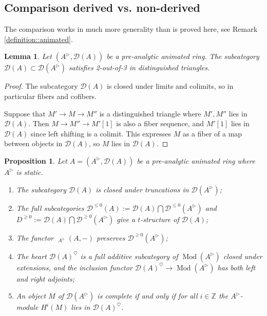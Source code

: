 \documentclass{article}
\theoremstyle{plain}
\newtheorem{prop}[thm]{Proposition}
\newtheorem{lem}[thm]{Lemma}
\theoremstyle{definition}
\theoremstyle{remark}
\DeclareMathOperator{\Homs}{\underline{Hom}}
\DeclareMathOperator{\modcat}{Mod}
\newcommand{\huflag}{\triangleright}
\newcommand{\D}{\mathcal{D}}
\newcommand{\heart}{\heartsuit}
\begin{document}
\subsection{Comparison derived vs. non-derived}
The comparison works in much more generality than is proved here, see Remark \ref{definition::animated}.

\begin{lem}
Let $ (A ^{\huflag}, \D (A)) $ be a pre-analytic animated ring.
The subcategory $ \D (A)\subset \D (A ^{\huflag}) $ satisfies 2-out-of-3 in distinguished triangles.
\end{lem}

\begin{proof}
The subcategory $ \D (A) $ is closed under limits and colimits, so in particular fibers and cofibers.

Suppose that $ M'\to M\to M'' $ is a distinguished triangle where $ M',M'' $ lies in $ \D (A) $.
Then $ M\to M''\to M'[1] $ is also a fiber sequence, and $ M' [1] $ lies in $ \D (A) $ since left shifting is a colimit.
This expresses $ M $ as a fiber of a map between objects in $ \D (A) $, so $ M $ lies in $ \D (A) $.
\end{proof}

\begin{prop}
Let $ A = (A ^{\huflag}, \D (A)) $ be a pre-analytic animated ring where $ A ^{\huflag} $ is static.
\begin{enumerate}
\item The subcategory $ \D (A) $ is closed under truncations in $ \D (A ^{\huflag}) $;
\item The full subcategories $ \D ^{\leq 0}(A) := \D (A) \bigcap \D ^{\leq 0}(A ^{\huflag}) $ and $ D ^{\geq 0} := \D (A) \bigcap \D ^{\geq 0} (A ^{\huflag}) $
give a $ t $-structure of $ \D (A) $;
\item The functor $ \Homs _{A ^{\huflag}}(A, -) $ preserves $ \D ^{\geq 0}(A ^{\huflag}) $;
\item The heart $ \D (A)^{\heart} $ is a full additive subcategory of $ \modcat (A ^{\huflag}) $ closed under extensions,
and the inclusion functor $ \D (A)^{\heart}\to \modcat (A ^{\huflag}) $ has both left and right adjoints;
\item An object $ M $ of $ \D (A ^{\huflag}) $ is complete if and only if for all $ i\in \mathbb{Z} $ the $ A ^{\huflag} $-module
$ H ^{i}(M) $ lies in $ \D (A)^{\heart} $.
\end{enumerate}
\label{definition::tstr}
\end{prop}
\end{document}
